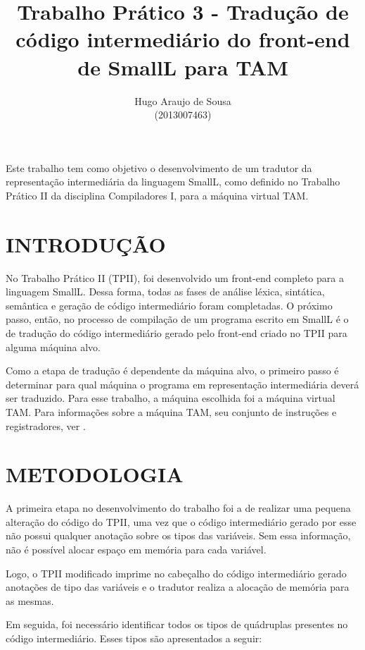 \documentclass[12pt]{article}
\title{Trabalho Prático 3 - Tradução de código intermediário do front-end de SmallL para TAM}
\author{Hugo Araujo de Sousa\\(2013007463)}
\begin{document}
 

\maketitle
     
\begin{resumo}
  Este trabalho tem como objetivo o desenvolvimento de um tradutor da representação
  intermediária da linguagem SmallL, como definido no Trabalho Prático II da disciplina
  Compiladores I, para a máquina virtual TAM.
\end{resumo}

\section{INTRODUÇÃO}

No Trabalho Prático II (TPII), foi desenvolvido um front-end completo para a linguagem SmallL. Dessa forma, todas as fases
de análise léxica, sintática, semântica e geração de código intermediário foram completadas. O próximo passo, então,
no processo de compilação de um programa escrito em SmallL é o de tradução do código intermediário gerado pelo front-end
criado no TPII para alguma máquina alvo.

Como a etapa de tradução é dependente da máquina alvo, o primeiro passo é determinar para qual máquina o programa em
representação intermediária deverá ser traduzido. Para esse trabalho, a máquina escolhida foi a máquina virtual TAM. Para
informações sobre a máquina TAM, seu conjunto de instruções e registradores, ver \cite{Watt:2007:PLP:1557477}.

\section{METODOLOGIA} \label{sec:met}

A primeira etapa no desenvolvimento do trabalho foi a de realizar uma pequena alteração do código do TPII, uma vez que o
código intermediário gerado por esse não possui qualquer anotação sobre os tipos das variáveis. Sem essa informação,
não é possível alocar espaço em memória para cada variável.

Logo, o TPII modificado imprime no cabeçalho do código intermediário gerado anotações de tipo das variáveis e o tradutor
realiza a alocação de memória para as mesmas.

Em seguida, foi necessário identificar todos os tipos de quádruplas presentes no
código intermediário. Esses tipos são apresentados a seguir:
\end{document}
